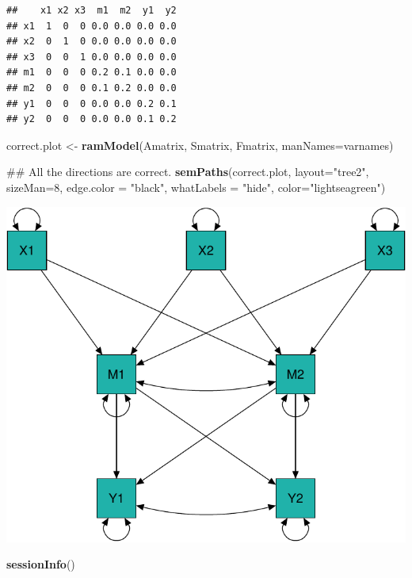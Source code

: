 \documentclass[]{article}
\newenvironment{Shaded}{\begin{snugshade}}{\end{snugshade}}
\newcommand{\KeywordTok}[1]{\textcolor[rgb]{0.13,0.29,0.53}{\textbf{#1}}}
\newcommand{\DataTypeTok}[1]{\textcolor[rgb]{0.13,0.29,0.53}{#1}}
\newcommand{\DecValTok}[1]{\textcolor[rgb]{0.00,0.00,0.81}{#1}}
\newcommand{\StringTok}[1]{\textcolor[rgb]{0.31,0.60,0.02}{#1}}
\newcommand{\NormalTok}[1]{#1}
\begin{document}
\begin{verbatim}
##    x1 x2 x3  m1  m2  y1  y2
## x1  1  0  0 0.0 0.0 0.0 0.0
## x2  0  1  0 0.0 0.0 0.0 0.0
## x3  0  0  1 0.0 0.0 0.0 0.0
## m1  0  0  0 0.2 0.1 0.0 0.0
## m2  0  0  0 0.1 0.2 0.0 0.0
## y1  0  0  0 0.0 0.0 0.2 0.1
## y2  0  0  0 0.0 0.0 0.1 0.2
\end{verbatim}

\begin{Shaded}
\begin{Highlighting}[]
\NormalTok{correct.plot <-}\StringTok{ }\KeywordTok{ramModel}\NormalTok{(Amatrix, Smatrix, Fmatrix, }\DataTypeTok{manNames=}\NormalTok{varnames)}

\NormalTok{## All the directions are correct.}
\KeywordTok{semPaths}\NormalTok{(correct.plot, }\DataTypeTok{layout=}\StringTok{"tree2"}\NormalTok{, }\DataTypeTok{sizeMan=}\DecValTok{8}\NormalTok{, }\DataTypeTok{edge.color =} \StringTok{"black"}\NormalTok{, }
         \DataTypeTok{whatLabels =} \StringTok{"hide"}\NormalTok{, }\DataTypeTok{color=}\StringTok{"lightseagreen"}\NormalTok{)}
\end{Highlighting}
\end{Shaded}

\includegraphics{Supplemental_materials_3_files/figure-latex/unnamed-chunk-14-1.pdf}

\begin{Shaded}
\begin{Highlighting}[]
\KeywordTok{sessionInfo}\NormalTok{()}
\end{Highlighting}
\end{Shaded}
\end{document}
